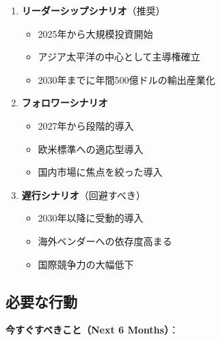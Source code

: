 \documentclass[
  a4paper,
  a4paper,
  11pt]{ltjsbook}
\providecommand{\tightlist}{%
  \setlength{\itemsep}{0pt}\setlength{\parskip}{0pt}}
\begin{document}
\begin{enumerate}
\def\labelenumi{\arabic{enumi}.}
\tightlist
\item
  \textbf{リーダーシップシナリオ}（推奨）

  \begin{itemize}
  \tightlist
  \item
    2025年から大規模投資開始
  \item
    アジア太平洋の中心として主導権確立
  \item
    2030年までに年間500億ドルの輸出産業化
  \end{itemize}
\item
  \textbf{フォロワーシナリオ}

  \begin{itemize}
  \tightlist
  \item
    2027年から段階的導入
  \item
    欧米標準への適応型導入
  \item
    国内市場に焦点を絞った導入
  \end{itemize}
\item
  \textbf{遅行シナリオ}（回避すべき）

  \begin{itemize}
  \tightlist
  \item
    2030年以降に受動的導入
  \item
    海外ベンダーへの依存度高まる
  \item
    国際競争力の大幅低下
  \end{itemize}
\end{enumerate}

\subsection{必要な行動}\label{ux5fc5ux8981ux306aux884cux52d5}

\textbf{今すぐすべきこと（Next 6 Months）}：
\end{document}
